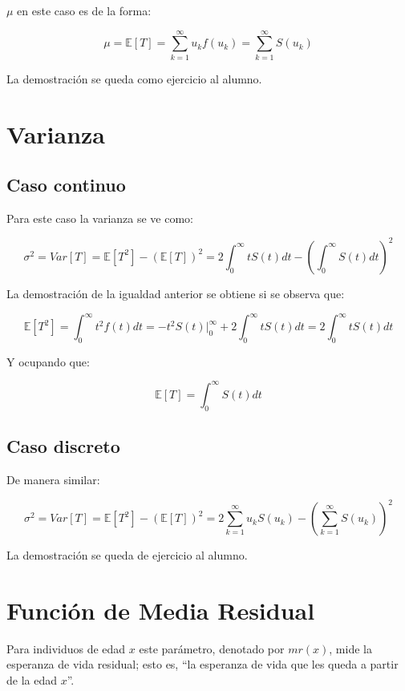 \documentclass[
  a4paper,
  oneside,
  openany]{book}
\begin{document}
\(\mu\) en este caso es de la forma:

\[
\mu=\mathbb{E}[T]=\sum_{k=1}^{\infty}u_kf(u_k)=\sum_{k=1}^{\infty}S(u_k)
\]

La demostración se queda como ejercicio al alumno.

\hypertarget{varianza}{%
\section{Varianza}\label{varianza}}

\hypertarget{caso-continuo-4}{%
\subsection*{Caso continuo}\label{caso-continuo-4}}


Para este caso la varianza se ve como:

\[
  \sigma^2=Var[T]=\mathbb{E}[T^2]-(\mathbb{E}[T])^2=2\int_{0}^{\infty}tS(t)dt-\left(\int_{0}^{\infty}S(t)dt\right)^2
\]

La demostración de la igualdad anterior se obtiene si se observa que:

\[
\mathbb{E}[T^2]=\int_{0}^{\infty}t^2f(t)dt=-t^2S(t)|_0^{\infty}+2\int_{0}^{\infty}tS(t)dt=2\int_{0}^{\infty}tS(t)dt
\]

Y ocupando que:

\[
\mathbb{E}[T]=\int_{0}^{\infty}S(t)dt
\]

\hypertarget{caso-discreto-4}{%
\subsection*{Caso discreto}\label{caso-discreto-4}}


De manera similar:

\[
  \sigma^2=Var[T]=\mathbb{E}[T^2]-(\mathbb{E}[T])^2=2\sum_{k=1}^{\infty}u_kS(u_k)-\left(\sum_{k=1}^{\infty}S(u_k)\right)^2
\]

La demostración se queda de ejercicio al alumno.

\hypertarget{funciuxf3n-de-media-residual}{%
\section{Función de Media Residual}\label{funciuxf3n-de-media-residual}}

Para individuos de edad \(x\) este parámetro, denotado por \(mr(x)\), mide la esperanza de vida residual; esto es, ``la esperanza de vida que les queda a partir de la edad \(x\)''.
\end{document}
